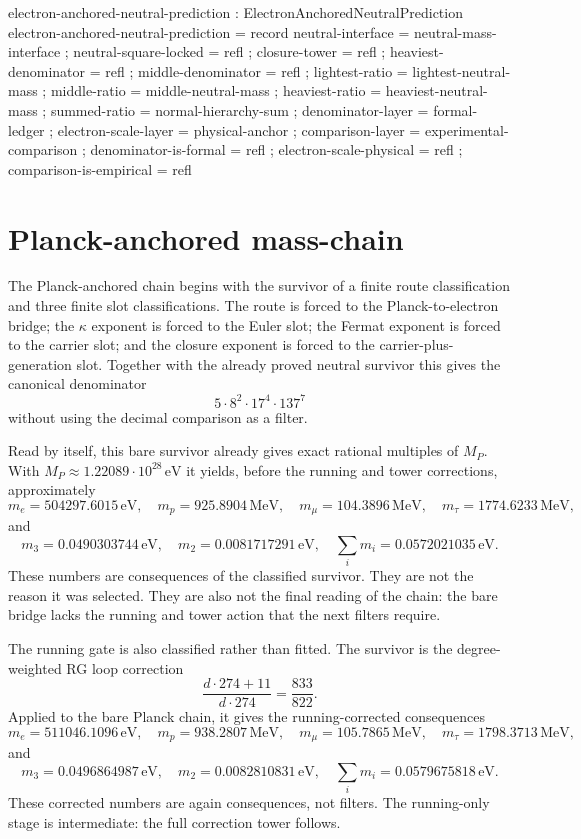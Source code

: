 \documentclass[11pt]{article}
\begin{document}
\begin{code}
electron-anchored-neutral-prediction : ElectronAnchoredNeutralPrediction
electron-anchored-neutral-prediction = record
  { neutral-interface       = neutral-mass-interface
  ; neutral-square-locked   = refl
  ; closure-tower           = refl
  ; heaviest-denominator    = refl
  ; middle-denominator      = refl
  ; lightest-ratio          = lightest-neutral-mass
  ; middle-ratio            = middle-neutral-mass
  ; heaviest-ratio          = heaviest-neutral-mass
  ; summed-ratio            = normal-hierarchy-sum
  ; denominator-layer       = formal-ledger
  ; electron-scale-layer    = physical-anchor
  ; comparison-layer        = experimental-comparison
  ; denominator-is-formal   = refl
  ; electron-scale-physical = refl
  ; comparison-is-empirical = refl
  }
\end{code}

\section{Planck-anchored mass-chain}

The Planck-anchored chain begins with the survivor of a finite route
classification and three finite slot classifications.  The route is
forced to the Planck-to-electron bridge; the $\kappa$ exponent is forced
to the Euler slot; the Fermat exponent is forced to the carrier slot; and
the closure exponent is forced to the carrier-plus-generation slot.
Together with the already proved neutral survivor this gives the
canonical denominator
\[
  5\cdot 8^2\cdot 17^4\cdot 137^7
\]
without using the decimal comparison as a filter.

Read by itself, this bare survivor already gives exact rational
multiples of $M_P$.  With $M_P \approx
1.22089\cdot 10^{28}\,\mathrm{eV}$ it yields, before the running and
tower corrections, approximately
\[
  m_e = 504297.6015\,\mathrm{eV},\quad
  m_p = 925.8904\,\mathrm{MeV},\quad
  m_\mu = 104.3896\,\mathrm{MeV},\quad
  m_\tau = 1774.6233\,\mathrm{MeV},
\]
and
\[
  m_3 = 0.0490303744\,\mathrm{eV},\quad
  m_2 = 0.0081717291\,\mathrm{eV},\quad
  \sum_i m_i = 0.0572021035\,\mathrm{eV}.
\]
These numbers are consequences of the classified survivor.  They are not
the reason it was selected.  They are also not the final reading of the
chain: the bare bridge lacks the running and tower action that the next
filters require.

The running gate is also classified rather than fitted.  The survivor is
the degree-weighted RG loop correction
\[
  \frac{d\cdot 274 + 11}{d\cdot 274} = \frac{833}{822}.
\]
Applied to the bare Planck chain, it gives the running-corrected
consequences
\[
  m_e = 511046.1096\,\mathrm{eV},\quad
  m_p = 938.2807\,\mathrm{MeV},\quad
  m_\mu = 105.7865\,\mathrm{MeV},\quad
  m_\tau = 1798.3713\,\mathrm{MeV},
\]
and
\[
  m_3 = 0.0496864987\,\mathrm{eV},\quad
  m_2 = 0.0082810831\,\mathrm{eV},\quad
  \sum_i m_i = 0.0579675818\,\mathrm{eV}.
\]
These corrected numbers are again consequences, not filters.  The
running-only stage is intermediate: the full correction tower follows.
\end{document}
